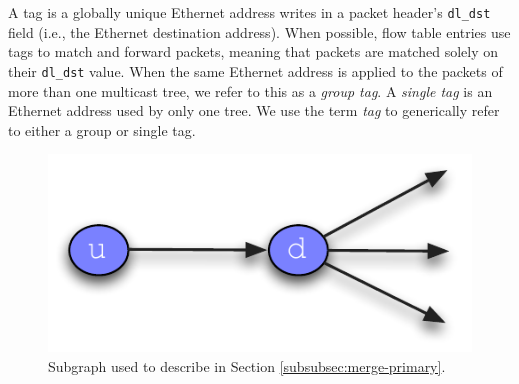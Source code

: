 A tag is a globally unique Ethernet address \merge writes in a packet header's {\tt dl\_dst} field (i.e., the Ethernet destination address).  When possible, \merge flow table entries use 
tags to match and forward packets, meaning that packets are matched solely on their {\tt dl\_dst} value.
When the same Ethernet address is applied to the packets of more than one multicast tree, we refer to this as a \emph{group tag}.  A \emph{single tag} is an 
Ethernet address used by only one tree. We use the term \emph{tag} to generically refer to either a group or single tag.

\begin{figure}
  \centering
   \includegraphics[scale=0.5]{figs/merger-ud.pdf}
\caption{Subgraph used to describe \merge in Section \ref{subsubsec:merge-primary}.}
\label{fig:merger-ud}
\end{figure}

